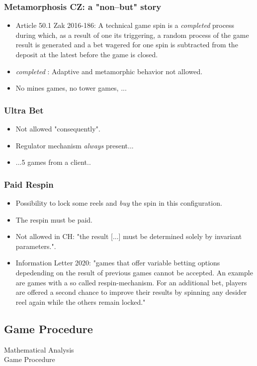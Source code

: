 \documentclass{beamer}
\begin{document}
\begin{frame}
\frametitle{Metamorphosis CZ: a "non--but" story}
\begin{itemize}
\item<1->Article 50.1 Zak 2016-186: A technical game spin is a \emph{completed} process during which, as a result of one its triggering, a random process of the game result is generated and a bet wagered for one spin is subtracted from the deposit at the latest before the game is closed.
\item<2-> \emph{completed} : Adaptive and metamorphic behavior not allowed.
\item<3-> No mines games, no tower games, ...
\end{itemize}
\end{frame}

\begin{frame}
\frametitle{Ultra Bet}
\begin{itemize}
\item<1-> Not allowed "consequently".
\item<2-> Regulator mechanism \emph{always} present...
\item<3-> ...5 games from a client..
\end{itemize}
\end{frame}

\begin{frame}
\frametitle{Paid Respin}
\begin{itemize}
\item<1-> Possibility to lock some reels and \emph{buy} the spin in this configuration.
\item<2-> The respin must be paid.
\item<3-> Not allowed in CH: "the result [...] must be determined solely by invariant parameters.".
\item<4-> Information Letter 2020: "games that offer variable betting options depedending on the result of previous games cannot be accepted. An example are games with a so called respin-mechanism. For an additional bet, players are offered a second chance to improve their results by spinning any desider reel again while the others remain locked."
\end{itemize}
\end{frame}

\begin{frame}
\section{Game Procedure}
\centering \Large Mathematical Analysis \\ \large Game Procedure
\end{frame}
\end{document}
